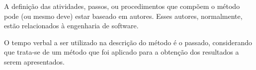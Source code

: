 A definição das atividades, passos, ou procedimentos que compõem o método pode (ou mesmo deve) estar baseado em autores. Esses autores, normalmente, estão relacionados à engenharia de software.

O tempo verbal a ser utilizado na descrição do método é o passado, considerando que trata-se de um método que foi aplicado para a obtenção dos resultados a serem apresentados.
